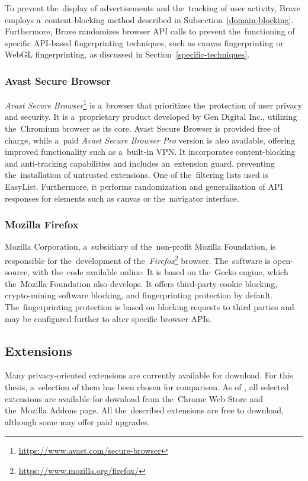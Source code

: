 To prevent the~display of advertisements and the~tracking of user activity, Brave employs a~content-blocking method described in Subsection~\ref{domain-blocking}. Furthermore, Brave randomizes browser API calls to prevent the~functioning of specific API-based fingerprinting techniques, such as canvas fingerprinting or WebGL fingerprinting, as discussed in Section~\ref{specific-techniques}. 

\subsubsection{Avast Secure Browser}
\textit{Avast Secure Browser}\footnote{\url{https://www.avast.com/secure-browser}} is a~browser that prioritizes the~protection of user privacy and security. It is a~proprietary product developed by Gen Digital Inc., utilizing the~Chromium browser as its core. Avast Secure Browser is provided free of charge, while a~paid \textit{Avast Secure Browser Pro} version is also available, offering improved functionality such as a~built-in VPN. It incorporates content-blocking and anti-tracking capabilities and includes an~extension guard, preventing the~installation of untrusted extensions. One of the~filtering lists used is EasyList. Furthermore, it performs randomization and generalization of API responses for elements such as canvas or the~navigator interface.

\subsubsection{Mozilla Firefox}
Mozilla Corporation, a~subsidiary of the~non-profit Mozilla Foundation, is responsible for the~development of the~\textit{Firefox}\footnote{\url{https://www.mozilla.org/firefox/}} browser. The~software is open-source, with the~code available online. It is based on the~Gecko engine, which the~Mozilla Foundation also develops. It offers third-party cookie blocking, crypto-mining software blocking, and fingerprinting protection by default. The~fingerprinting protection is based on blocking requests to third parties and may be configured further to alter specific browser APIs. 

\subsection{Extensions}
Many privacy-oriented extensions are currently available for download. For this thesis, a~selection of them has been chosen for comparison. As of , all selected extensions are available for download from the~Chrome Web Store and the~Mozilla Addons page. All the~described extensions are free to download, although some may offer paid upgrades.

